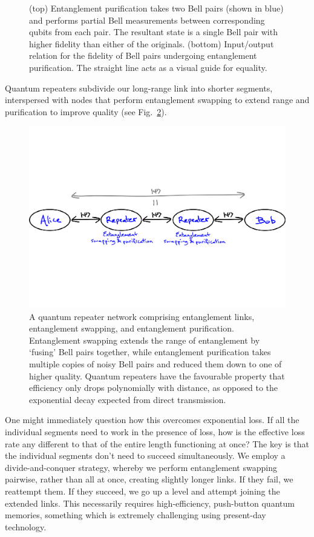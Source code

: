 \begin{figure}[!htb]
	\caption{(top) Entanglement purification takes two Bell pairs (shown in blue) and performs partial Bell measurements between corresponding qubits from each pair. The resultant state is a single Bell pair with higher fidelity than either of the originals. (bottom) Input/output relation for the fidelity of Bell pairs undergoing entanglement purification. The straight line acts as a visual guide for equality.} \label{fig:purification}
\end{figure}

Quantum repeaters subdivide our long-range link into shorter segments, interspersed with nodes that perform entanglement swapping to extend range and purification to improve quality (see Fig.~\ref{fig:repeater}).

\begin{figure}[!htb]
	\centering
	\includegraphics[width=2\columnwidth]{figures/Repeater}
	\caption{A quantum repeater network comprising entanglement links, entanglement swapping, and entanglement purification. Entanglement swapping extends the range of entanglement by `fusing' Bell pairs together, while entanglement purification takes multiple copies of noisy Bell pairs and reduced them down to one of higher quality. Quantum repeaters have the favourable property that efficiency only drops polynomially with distance, as opposed to the exponential decay expected from direct transmission.} \label{fig:repeater}
\end{figure}

One might immediately question how this overcomes exponential loss. If all the individual segments need to work in the presence of loss, how is the effective loss rate any different to that of the entire length functioning at once? The key is that the individual segments don't need to succeed simultaneously. We employ a divide-and-conquer strategy, whereby we perform entanglement swapping pairwise, rather than all at once, creating slightly longer links. If they fail, we reattempt them. If they succeed, we go up a level and attempt joining the extended links. This necessarily requires high-efficiency, push-button quantum memories, something which is extremely challenging using present-day technology.

